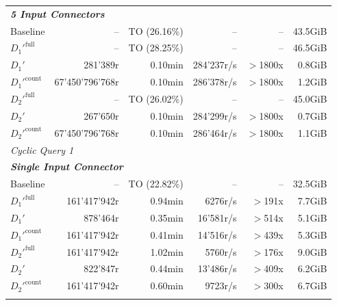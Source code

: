 \begin{longtable}{lrrrrr}
    \multicolumn{6}{l}{\textit{\textbf{5 Input Connectors}}} \\
    \nopagebreak
    Baseline              &  --                   &  TO (26.16\%)    &  --                 & --                & 43.5GiB   \\
    $D_1'^{\text{full}}$   &  --                   &  TO (28.25\%)    &  --                 & --                & 46.5GiB   \\
    \quad $D_1'$           &  281'389r             &  0.10min         &  284'237r/s         & $>$1800x           & 0.8GiB    \\
    $D_1'^{\text{count}}$  &  67'450'796'768r      &  0.10min         &  286'378r/s         & $>$1800x           & 1.2GiB    \\
    $D_2'^{\text{full}}$   &  --                   &  TO (26.02\%)    &  --                 & --                & 45.0GiB   \\
    \quad $D_2'$           &  267'650r             &  0.10min         &  284'299r/s         & $>$1800x           & 0.7GiB    \\
    $D_2'^{\text{count}}$  &  67'450'796'768r      &  0.10min         &  286'464r/s         & $>$1800x           & 1.1GiB    \\
    \midrule

    \multicolumn{6}{l}{\textit{Cyclic Query 1}} \\
    \midrule
    \multicolumn{6}{l}{\textit{\textbf{Single Input Connector}}} \\
    \nopagebreak
    Baseline              &  --                   &  TO (22.82\%)   &  --                  & --                & 32.5GiB   \\
    $D_1'^{\text{full}}$   &  161'417'942r         &  0.94min        &  6276r/s             & $>$191x           & 7.7GiB    \\
    \quad $D_1'$           &  878'464r             &  0.35min        &  16'581r/s           & $>$514x           & 5.1GiB    \\
    $D_1'^{\text{count}}$  &  161'417'942r         &  0.41min        &  14'516r/s           & $>$439x           & 5.3GiB    \\
    $D_2'^{\text{full}}$   &  161'417'942r         &  1.02min        &  5760r/s             & $>$176x           & 9.0GiB    \\
    \quad $D_2'$           &  822'847r             &  0.44min        &  13'486r/s           & $>$409x           & 6.2GiB    \\
    $D_2'^{\text{count}}$  &  161'417'942r         &  0.60min        &  9723r/s             & $>$300x           & 6.7GiB    \\
    \addlinespace


\end{longtable}
